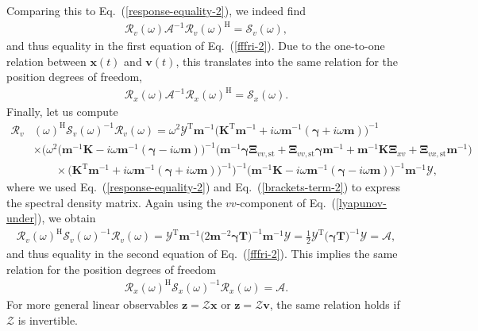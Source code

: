 \documentclass[aps,pre,twocolumn,superscriptaddress,notitlepage]{revtex4-2}
\newcommand{\nn}{\nonumber \\}
\newcommand{\n}{\nonumber}
\newcommand{\bmc}[1]{\bm{\mathcal{#1}}}
\renewcommand{\eqref}[1]{Eq.~(\ref{#1})}
\begin{document}
Comparing this to \eqref{response-equality-2}, we indeed find
\begin{align}
\bmc{R}_v(\omega) \bmc{A}^{-1} \bmc{R}_v(\omega)^\text{H} = \bmc{S}_v(\omega) ,
\end{align}
and thus equality in the first equation of \eqref{fffri-2}.
Due to the one-to-one relation between $\bm{x}(t)$ and $\bm{v}(t)$, this translates into the same relation for the position degrees of freedom,
\begin{align}
\bmc{R}_x(\omega) \bmc{A}^{-1} \bmc{R}_x(\omega)^\text{H} = \bmc{S}_x(\omega) .
\end{align}
Finally, let us compute
\begin{align}
\bmc{R}_v&(\omega)^\text{H} \bmc{S}_v(\omega)^{-1} \bmc{R}_v(\omega) = \omega^2 \bmc{Y}^\text{T} \bm{m}^{-1} \big(  \bm{K}^\text{T} \bm{m}^{-1} + i \omega \bm{m}^{-1} (\bm{\gamma} + i \omega \bm{m}) \big)^{-1} \\
&\times \bigg( \omega^2 \big(\bm{m}^{-1} \bm{K} - i \omega \bm{m}^{-1}(\bm{\gamma} - i \omega \bm{m}) \big)^{-1}  \Big( \bm{m}^{-1} \bm{\gamma} \bm{\Xi}_{vv,\text{st}} + \bm{\Xi}_{vv,\text{st}} \bm{\gamma} \bm{m}^{-1} + \bm{m}^{-1} \bm{K} \bm{\Xi}_{xv} + \bm{\Xi}_{vx,\text{st}} \bm{m}^{-1} \Big) \nn
&\qquad \times \big( \bm{K}^\text{T} \bm{m}^{-1}  + i \omega \bm{m}^{-1}(\bm{\gamma} + i \omega \bm{m}) \big)^{-1} \bigg)^{-1} \big( \bm{m}^{-1} \bm{K} - i \omega \bm{m}^{-1} (\bm{\gamma} - i \omega \bm{m}) \big)^{-1} \bm{m}^{-1} \bmc{Y} \n,
\end{align}
where we used \eqref{response-equality-2} and \eqref{brackets-term-2} to express the spectral density matrix.
Again using the $vv$-component of \eqref{lyapunov-under}, we obtain
\begin{align}
\bmc{R}_v(\omega)^\text{H} \bmc{S}_v(\omega)^{-1} \bmc{R}_v(\omega) = \bmc{Y}^\text{T} \bm{m}^{-1} \big( 2 \bm{m}^{-2} \bm{\gamma} \bm{T} \big)^{-1} \bm{m}^{-1} \bmc{Y} = \frac{1}{2} \bmc{Y}^\text{T} \big( \bm{\gamma} \bm{T} \big)^{-1} \bmc{Y} = \bmc{A},
\end{align}
and thus equality in the second equation of \eqref{fffri-2}.
This implies the same relation for the position degrees of freedom
\begin{align}
\bmc{R}_x(\omega)^\text{H} \bmc{S}_x(\omega)^{-1} \bmc{R}_x(\omega) = \bmc{A} .
\end{align}
For more general linear observables $\bm{z} = \bmc{Z} \bm{x}$ or $\bm{z} = \bmc{Z} \bm{v}$, the same relation holds if $\bmc{Z}$ is invertible.
\end{document}
